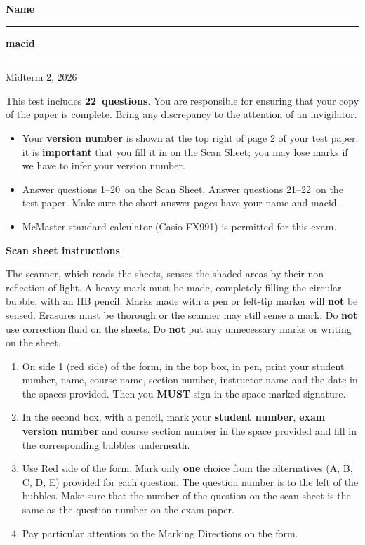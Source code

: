 \documentclass[12pt]{article}
\def\midterm{2}
\def\year{2026}
\def\questions{22}
\def\mc{1--20}
\def\saq{questions 21--22}
\begin{document}
\noindent \textbf{Name} \rule{5cm}{1pt} \hfill \textbf{macid} \rule{5cm}{1pt}

\noindent

\bigskip

{ \par}
{\centering Midterm \midterm, \year\par}

\parindent0pt

\vfill

This test includes {\bf \questions\ questions}. You are responsible for ensuring that your copy of the paper is complete. Bring any discrepancy to the attention of an invigilator. 

\vfill

\begin{itemize}
\item Your \textbf{version number} is shown at the top right of page 2 of your test paper: it is \textbf{important} that you fill it in on the Scan Sheet; you may lose marks if we have to infer your version number.
\item Answer questions \mc\ on the Scan Sheet. Answer \saq\ on the test paper. Make sure the short-answer pages have your name and macid.
\item McMaster standard calculator (Casio-FX991) is permitted for this exam.
\end{itemize}

\vfill

\textbf{Scan sheet instructions}

\small{
The scanner, which reads the sheets, senses the shaded areas by their non-reflection of light. A heavy mark must be made, completely filling the circular bubble, with an HB pencil. Marks made with a pen or felt-tip marker will \textbf{not} be sensed. Erasures must be thorough or the scanner may still sense a mark. Do \textbf{not} use correction fluid on the sheets. Do \textbf{not} put any unnecessary marks or writing on the sheet.

\begin{enumerate}
\item On side 1 (red side) of the form, in the top box, in pen, print your student number, name, course name, section number, instructor name and the date in the spaces provided. Then you {\bf MUST} sign in the space marked signature.

\item In the second box, with a pencil, mark your {\bf student number}, {\bf exam version number} and course section number in the space provided and fill in the corresponding bubbles underneath.

\item Use Red side of the form. Mark only {\bf one} choice from the alternatives (A, B, C, D, E) provided for each question. The question number is to the left of the bubbles. Make sure that the number of the question on the scan sheet is the same as the question number on the exam paper.
\item  Pay particular attention to the Marking Directions on the form.
\end{enumerate}
}

\vfill
{ \par}
\end{document}
